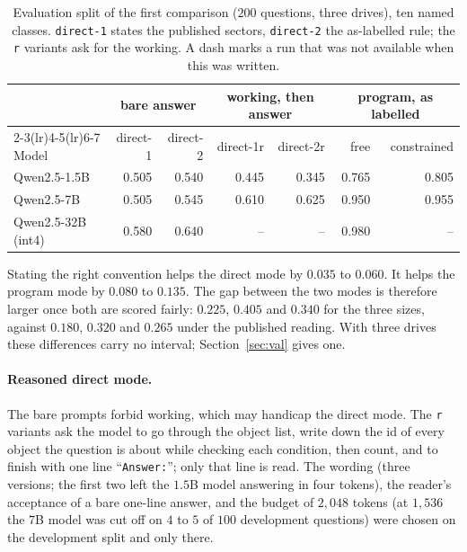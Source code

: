 \documentclass[11pt,a4paper]{article}
\newcommand{\code}[1]{\texttt{\small #1}}
\newcommand{\nr}{--}
\begin{document}
\begin{table}[ht]
\centering
\small
\begin{tabular}{lrrrrrr}
\toprule
 & \multicolumn{2}{c}{bare answer} & \multicolumn{2}{c}{working, then answer}
 & \multicolumn{2}{c}{program, as labelled} \\
\cmidrule(lr){2-3}\cmidrule(lr){4-5}\cmidrule(lr){6-7}
Model & direct-1 & direct-2 & direct-1r & direct-2r & free & constrained \\
\midrule
Qwen2.5-1.5B       & 0.505 & 0.540 & 0.445 & 0.345 & 0.765 & 0.805 \\
Qwen2.5-7B         & 0.505 & 0.545 & 0.610 & 0.625 & 0.950 & 0.955 \\
Qwen2.5-32B (int4) & 0.580 & 0.640 & \nr   & \nr   & 0.980 & \nr \\
\bottomrule
\end{tabular}
\caption{Evaluation split of the first comparison ($200$ questions, three
drives), ten named classes. \code{direct-1} states the published sectors,
\code{direct-2} the as-labelled rule; the \code{r} variants ask for the
working. A dash marks a run that was not available when this was written.}
\label{tab:direct}
\end{table}

Stating the right convention helps the direct mode by $0.035$ to $0.060$. It
helps the program mode by $0.080$ to $0.135$. The gap between the two modes
is therefore larger once both are scored fairly: $0.225$, $0.405$ and $0.340$
for the three sizes, against $0.180$, $0.320$ and $0.265$ under the published
reading. With three drives these differences carry no interval;
Section~\ref{sec:val} gives one.

\paragraph{Reasoned direct mode.} The bare prompts forbid working, which may
handicap the direct mode. The \code{r} variants ask the model to go through
the object list, write down the id of every object the question is about
while checking each condition, then count, and to finish with one line
``\code{Answer:}''; only that line is read. The wording (three versions; the
first two left the $1.5$B model answering in four tokens), the reader's
acceptance of a bare one-line answer, and the budget of $2{,}048$ tokens (at
$1{,}536$ the $7$B model was cut off on $4$ to $5$ of $100$ development
questions) were chosen on the development split and only there.
\end{document}
